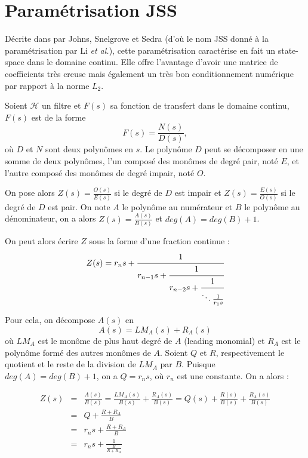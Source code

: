 \section{Paramétrisation JSS\label{anx:JSS}}
Décrite dans \cite{JSS89,LGS00} par Johns, Snelgrove et Sedra (d'où le nom JSS donné à la paramétrisation par Li \emph{et al.}), cette paramétrisation caractérise en fait un state-space dans le domaine continu. Elle offre l'avantage d'avoir une matrice de coefficients très creuse mais également un très bon conditionnement numérique par rapport à la norme $L_2$.

Soient $\mathcal{H}$ un filtre et $F(s)$ sa fonction de transfert dans le domaine continu, $F(s)$ est de la forme
\begin{equation}\label{eq:fct_transfert_continue}
F(s)=\frac{N(s)}{D(s)},
\end{equation}
où $D$ et $N$ sont deux polynômes en $s$. Le polynôme $D$ peut se décomposer en une somme de deux polynômes, l'un composé des monômes de degré pair, noté $E$, et l'autre composé des monômes de degré impair, noté $O$. 

On pose alors $Z(s)=\frac{O(s)}{E(s)}$ si le degré de $D$ est impair et $Z(s)=\frac{E(s)}{O(s)}$ si le degré de $D$ est pair. On note $A$ le polynôme au numérateur et $B$ le polynôme au dénominateur, on a alors $Z(s)=\frac{A(s)}{B(s)}$ et $deg(A)=deg(B)+1$.

On peut alors écrire $Z$ sous la forme d'une fraction continue :
\begin{equation}\label{eq:frac_continue}
Z(s)=r_n s+\cfrac{1}{r_{n-1}s+\cfrac{1}{r_{n-2}s+\cfrac{1}{\ddots \frac{1}{r_1s}}}}
\end{equation}

Pour cela, on décompose $A(s)$ en
\begin{equation}
A(s)=LM_A(s) + R_A(s)
\label{eq:6}
\end{equation}
où $LM_A$ est le monôme de plus haut degré de $A$ (leading monomial) et $R_A$ est le polynôme formé des autres monômes de $A$. Soient $Q$ et $R$, respectivement le quotient et le reste de la division de $LM_A$ par $B$. Puisque $deg(A)=deg(B)+1$, on a $Q=r_ns$, où $r_n$ est une constante. On a alors :

\begin{eqnarray}
Z (s)& = & \frac{A(s)}{B(s)}=\frac{LM_A(s)}{B(s)}+\frac{R_A(s)}{B(s)} = Q(s)+\frac{R(s)}{B(s)}+\frac{R_A(s)}{B(s)}\\
  & = & Q + \frac{R+R_A}{B}\\
  & = & r_ns + \frac{R+R_A}{B}\\
  & = & r_ns + \frac{1}{\frac{B}{R+R_A}}
\end{eqnarray}

